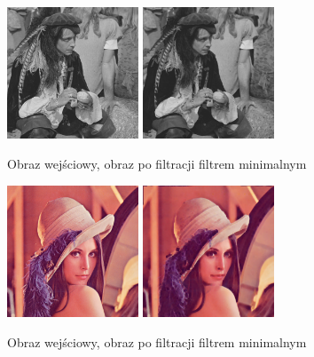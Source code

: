 \documentclass[final,a4paper,openany,12pt]{mwbk}
\begin{document}
\begin{figure}[H]
	\begin{center}
		\includegraphics[width=0.35\textwidth]{pirate_gray}
		\includegraphics[width=0.35\textwidth]{pirate_gray_min_result}
	\end{center}
	\caption{Obraz wejściowy, obraz po filtracji filtrem minimalnym}
\end{figure}

\begin{figure}[H]
	\begin{center}
		\includegraphics[width=0.35\textwidth]{lena_color}
		\includegraphics[width=0.35\textwidth]{lena_color_min_result}
	\end{center}
	\caption{Obraz wejściowy, obraz po filtracji filtrem minimalnym}
\end{figure}
\end{document}
